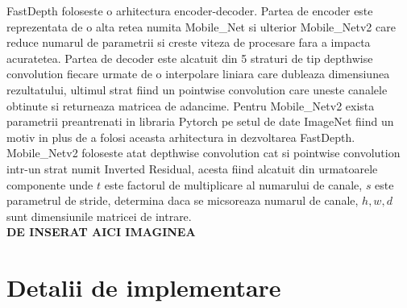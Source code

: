 \documentclass[12pt,a4paper]{report}
\begin{document}
FastDepth foloseste o arhitectura encoder-decoder. Partea de encoder este reprezentata de o alta 
retea numita Mobile\_Net si ulterior Mobile\_Netv2 care reduce numarul de parametrii si creste 
viteza de procesare fara a impacta acuratetea. Partea de decoder este alcatuit din 5 straturi de 
tip depthwise convolution fiecare urmate de o interpolare liniara care dubleaza dimensiunea 
rezultatului, ultimul strat fiind un pointwise convolution care uneste canalele obtinute  
si returneaza matricea de adancime. Pentru Mobile\_Netv2 exista parametrii preantrenati in libraria 
Pytorch pe setul de date ImageNet fiind un motiv in plus de a folosi aceasta arhitectura 
in dezvoltarea FastDepth. Mobile\_Netv2 foloseste atat depthwise convolution cat 
si pointwise convolution intr-un strat numit Inverted Residual, acesta fiind alcatuit din 
urmatoarele componente unde $ t $ este factorul de multiplicare al numarului de canale,
$ s $ este parametrul de stride, determina daca se micsoreaza numarul de canale, $ h, w, d $
sunt dimensiunile matricei de intrare.   \\
\textbf{DE INSERAT AICI IMAGINEA}



\chapter{Detalii de implementare}
\end{document}
